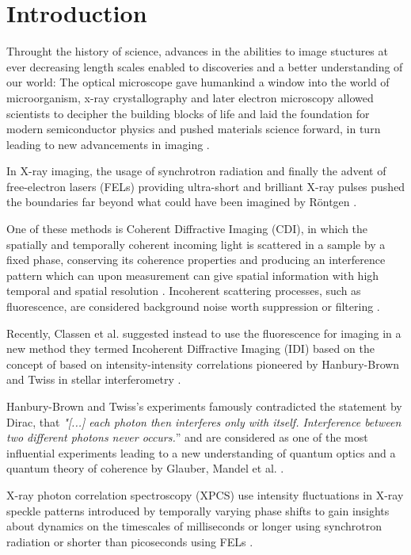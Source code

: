 \chapter{Introduction}
Throught the history of science, advances in the abilities to image stuctures at ever decreasing length scales enabled to discoveries and a better understanding of our world:
The optical microscope gave humankind a window into the world of microorganism, x-ray crystallography and later electron microscopy allowed scientists to decipher the building blocks of life and laid the foundation for modern semiconductor physics and pushed materials science forward, in turn leading to new advancements in imaging \cite{hooke1665,laue1915,ruska1939,watson1953,hovmoeller1984}.

In X-ray imaging, the usage of synchrotron radiation and finally the advent of free-electron lasers (FELs) providing ultra-short and brilliant X-ray pulses pushed the boundaries far beyond what could have been imagined by Röntgen \cite{cloetens1996,emma2010}. 

One of these methods is Coherent Diffractive Imaging (CDI), in which the spatially and temporally coherent incoming light is scattered in a sample by a fixed phase, conserving its coherence properties and producing an interference pattern which can upon measurement can give spatial information with high temporal and spatial resolution \cite{seibert2011,bostedt2010,barke2015}. Incoherent scattering processes, such as fluorescence, are considered background noise worth suppression or filtering \cite{schultz2013chapter7}. 

 Recently, Classen et al. suggested instead to use the fluorescence for imaging in a new method they termed Incoherent Diffractive Imaging (IDI) \cite{classen2017} based on the concept of based on intensity-intensity correlations pioneered by Hanbury-Brown and Twiss in stellar interferometry \cite{hanbury1956}. 
 
Hanbury-Brown and Twiss's experiments famously contradicted the statement by Dirac, that \textit{"[...] each photon then interferes only with itself. Interference between two different photons never occurs.}” \cite{dirac1958} and are considered as one of the most influential experiments leading to a new understanding of quantum optics and a quantum theory of coherence by Glauber, Mandel et al. \cite{glauber1963,mandel1959, hong1987,glauber2006} . 

 X-ray photon correlation spectroscopy (XPCS) use intensity fluctuations in X-ray speckle patterns introduced by  temporally varying phase shifts to gain insights about dynamics on the timescales of milliseconds or longer using synchrotron radiation or shorter than picoseconds using FELs \cite{lehmkuhler2021,grubel2007}.
 
